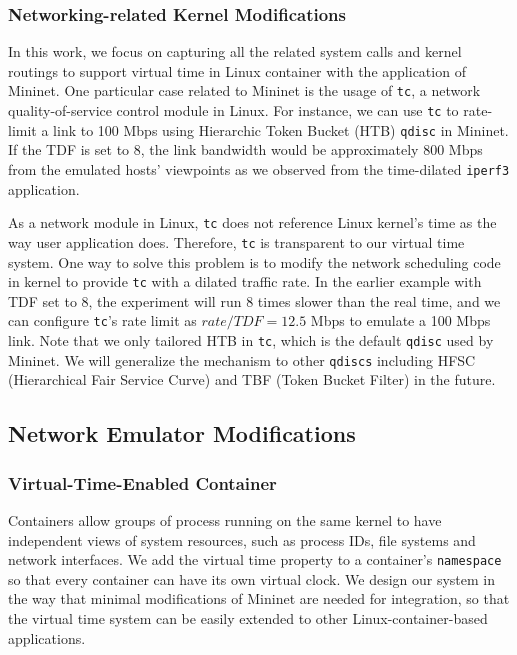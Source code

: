 \subsubsection{Networking-related Kernel Modifications}
In this work, we focus on capturing all the related system calls and kernel routings to support virtual time in Linux container with the application of Mininet. 
One particular case related to Mininet is the usage of \texttt{tc}, a network quality-of-service control module in Linux\cite{TrafficControl}. 
For instance, we can use \texttt{tc} to rate-limit a link to 100 Mbps using Hierarchic Token Bucket (HTB) \texttt{qdisc} in Mininet. If the TDF is set to 8, the link bandwidth would be approximately 800 Mbps from the emulated hosts' viewpoints as we observed from the time-dilated \texttt{iperf3} application.

As a network module in Linux, \texttt{tc} does not reference Linux kernel's time as the way user application does. 
Therefore, \texttt{tc} is transparent to our virtual time system. One way to solve this problem is to modify the network scheduling code in kernel to provide \texttt{tc} with a dilated traffic rate. 
In the earlier example with TDF set to 8, the experiment will run 8 times slower than the real time, and we can configure \texttt{tc}'s rate limit as $rate/TDF=12.5$ Mbps to emulate a 100 Mbps link. 
Note that we only tailored HTB in \texttt{tc}, which is the default \texttt{qdisc} used by Mininet. 
We will generalize the mechanism to other \texttt{qdiscs} including HFSC (Hierarchical Fair Service Curve) and TBF (Token Bucket Filter) in the future.

\subsection{Network Emulator Modifications}
\label{Sub-Sec-ImplementMininet}

\subsubsection{Virtual-Time-Enabled Container}
Containers allow groups of process running on the same kernel to have independent views of system resources, such as process IDs, file systems and network interfaces. 
We add the virtual time property to a container's \texttt{namespace}\cite{LinuxNamespace} so that every container can have its own virtual clock. 
We design our system in the way that minimal modifications of Mininet are needed for integration, so that the virtual time system can be easily extended to other Linux-container-based applications. 

